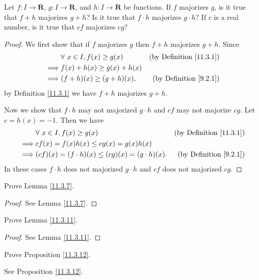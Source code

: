 \begin{exercise}\label{ex 11.3.2}
    Let \(f : I \to \mathbf{R}\), \(g : I \to \mathbf{R}\), and \(h : I \to \mathbf{R}\) be functions.
    If \(f\) majorizes \(g\), is it true that \(f + h\) majorizes \(g + h\)?
    Is it true that \(f \cdot h\) majorizes \(g \cdot h\)?
    If \(c\) is a real number, is it true that \(cf\) majorizes \(cg\)?
\end{exercise}

\begin{proof}
    We first show that if \(f\) majorizes \(g\) then \(f + h\) majorizes \(g + h\).
    Since
    \begin{align*}
        & \forall\ x \in I, f(x) \geq g(x) & \text{(by Definition \ref{11.3.1})} \\
        \implies & f(x) + h(x) \geq g(x) + h(x) \\
        \implies & (f + h)(x) \geq (g + h)(x), & \text{(by Definition \ref{9.2.1})}
    \end{align*}
    by Definition \ref{11.3.1} we have \(f + h\) majorizes \(g + h\).

    Now we show that \(f \cdot h\) may not majorized \(g \cdot h\) and \(cf\) may not majorize \(cg\).
    Let \(c = h(x) = -1\).
    Then we have
    \begin{align*}
        & \forall\ x \in I, f(x) \geq g(x) & \text{(by Definition \ref{11.3.1})} \\
        \implies & cf(x) = f(x) h(x) \leq cg(x) = g(x) h(x) \\
        \implies & (cf)(x) = (f \cdot h)(x) \leq (cg)(x) = (g \cdot h)(x). & \text{(by Definition \ref{9.2.1})}
    \end{align*}
    In these cases \(f \cdot h\) does not majorized \(g \cdot h\) and \(cf\) does not majorized \(cg\).
\end{proof}

\begin{exercise}\label{ex 11.3.3}
    Prove Lemma \ref{11.3.7}.
\end{exercise}

\begin{proof}
    See Lemma \ref{11.3.7}.
\end{proof}

\begin{exercise}\label{ex 11.3.4}
    Prove Lemma \ref{11.3.11}.
\end{exercise}

\begin{proof}
    See Lemma \ref{11.3.11}.
\end{proof}

\begin{exercise}\label{ex 11.3.5}
    Prove Proposition \ref{11.3.12}.
\end{exercise}

\begin{proposition}
    See Proposition \ref{11.3.12}.
\end{proposition}